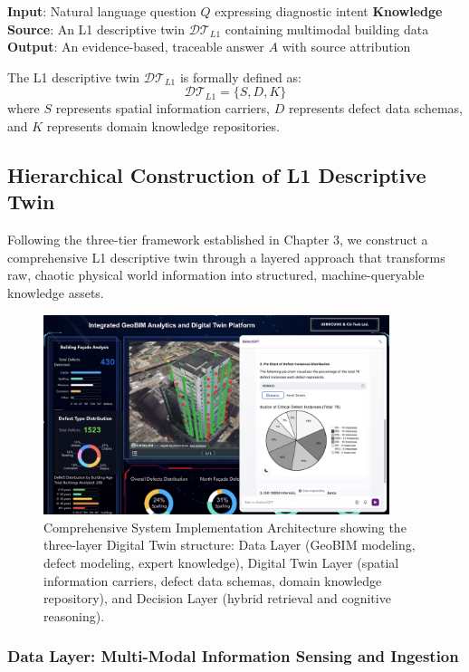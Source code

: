 \textbf{Input}: Natural language question $Q$ expressing diagnostic intent
\textbf{Knowledge Source}: An L1 descriptive twin $\mathcal{DT}_{L1}$ containing multimodal building data
\textbf{Output}: An evidence-based, traceable answer $A$ with source attribution

The L1 descriptive twin $\mathcal{DT}_{L1}$ is formally defined as:
\begin{equation}
\mathcal{DT}_{L1} = \{S, D, K\}
\end{equation}
where $S$ represents spatial information carriers, $D$ represents defect data schemas, and $K$ represents domain knowledge repositories.

\subsection{Hierarchical Construction of L1 Descriptive Twin}

Following the three-tier framework established in Chapter 3, we construct a comprehensive L1 descriptive twin through a layered approach that transforms raw, chaotic physical world information into structured, machine-queryable knowledge assets.

\begin{figure}[htbp]
\centering
\includegraphics[width=0.9\textwidth]{figures/DefectGPT/System_implement.png}
\caption{Comprehensive System Implementation Architecture showing the three-layer Digital Twin structure: Data Layer (GeoBIM modeling, defect modeling, expert knowledge), Digital Twin Layer (spatial information carriers, defect data schemas, domain knowledge repository), and Decision Layer (hybrid retrieval and cognitive reasoning).}
\label{fig:system-implementation}
\end{figure}

\subsubsection{Data Layer: Multi-Modal Information Sensing and Ingestion}

